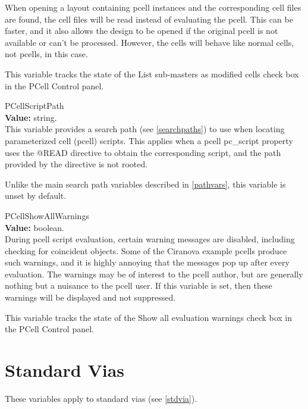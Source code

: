 \begin{description}
When opening a layout containing pcell instances and the corresponding
cell files are found, the cell files will be read instead of
evaluating the pcell.  This can be faster, and it also allows the
design to be opened if the original pcell is not available or can't be
processed.  However, the cells will behave like normal cells, not
pcells, in this case.

This variable tracks the state of the {\cb List sub-masters as
modified cells} check box in the {\cb PCell Control} panel.

\item{\et PCellScriptPath}\\
{\bf Value:} string.\\
This variable provides a search path (see \ref{searchpaths}) to use
when locating parameterized cell (pcell) scripts.  This applies when a
pcell {\et pc\_script} property uses the {\vt @READ} directive to
obtain the corresponding script, and the path provided by the
directive is not rooted.

Unlike the main search path variables described in \ref{pathvars},
this variable is unset by default.

\item{\et PCellShowAllWarnings}\\
{\bf Value:} boolean.\\
During pcell script evaluation, certain warning messages are disabled,
including checking for coincident objects.  Some of the Ciranova
example pcells produce such warnings, and it is highly annoying that
the messages pop up after every evaluation.  The warnings may be of
interest to the pcell author, but are generally nothing but a nuisance
to the pcell user.  If this variable is set, then these warnings will
be displayed and not suppressed.

This variable tracks the state of the {\cb Show all evaluation
warnings} check box in the {\cb PCell Control} panel.
\end{description}


\section{Standard Vias}

These variables apply to standard vias (see \ref{stdvia}).

